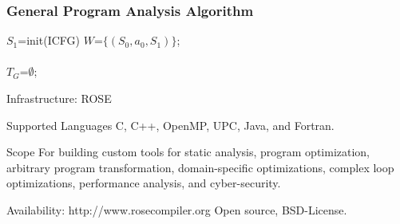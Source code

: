 \begin{frame}[fragile]
\frametitle{General Program Analysis Algorithm}
{
\scriptsize
\begin{algorithm}[H]
\SetLine
{}


$S_1$=init(ICFG) 
$W$=$\{(S_0,a_0,S_1)\}$; \\
\\
$T_G$=$\emptyset$; \\
\label{alg:general}
\end{algorithm}
}
\end{frame}



\begin{frame}{Infrastructure: ROSE}

\begin{block}{Supported Languages}
C, C++, OpenMP, UPC, Java, and Fortran. 
\end{block}

\begin{block}{Scope}
For building custom tools for static analysis, program optimization, arbitrary program transformation, domain-specific optimizations, complex loop optimizations, performance analysis, and cyber-security.
\end{block}

\begin{block}{Availability: http://www.rosecompiler.org}
Open source, BSD-License.
\end{block}
\end{frame}



